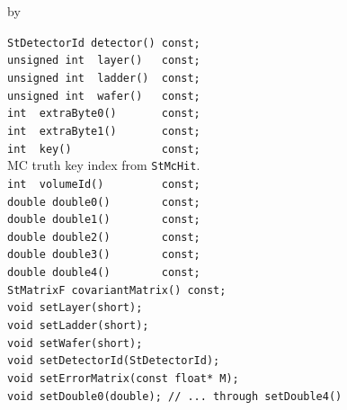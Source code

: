 \documentclass[twoside]{article}
\newcommand{\entrylabel}[1]{\mbox{\textbf{{#1}}}\hfil}%
\newenvironment{entry}
{\begin{list}{}%
    {\renewcommand{\makelabel}{\entrylabel}%
     \setlength{\labelwidth}{90pt}%
     \setlength{\leftmargin}{\labelwidth}
     \advance\leftmargin by \labelsep%
      }%
    }%
  {\end{list}}
\newcommand{\Entrylabel}[1]%
{\raisebox{0pt}[1ex][0pt]{\makebox[\labelwidth][l]%
    {\parbox[t]{\labelwidth}{\hspace{0pt}\textbf{{#1}}}}}}
\newenvironment{Entry}%
{\renewcommand{\entrylabel}{\Entrylabel}\begin{entry}}%
  {\end{entry}}
\begin{document}
\begin{Entry}
\item[Public Member\\ Functions]
    \verb+StDetectorId detector() const;+\\
    \verb+unsigned int  layer()   const;+\\
    \verb+unsigned int  ladder()  const;+\\
    \verb+unsigned int  wafer()   const;+\\
    \verb+int  extraByte0()       const;+\\
    \verb+int  extraByte1()       const;+\\
    \verb+int  key()              const;+\\
        MC truth key index from \texttt{StMcHit}.\\
    \verb+int  volumeId()         const;+\\
    \verb+double double0()        const;+\\
    \verb+double double1()        const;+\\
    \verb+double double2()        const;+\\
    \verb+double double3()        const;+\\
    \verb+double double4()        const;+\\
    \verb+StMatrixF covariantMatrix() const;+\\
    \verb+void setLayer(short);+\\
    \verb+void setLadder(short);+\\
    \verb+void setWafer(short);+\\
    \verb+void setDetectorId(StDetectorId);+\\
    \verb+void setErrorMatrix(const float* M);+\\
    \verb+void setDouble0(double); // ... through setDouble4()+\\
\end{Entry}
\clearpage

\end{document}
